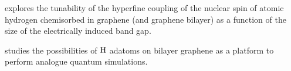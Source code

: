  explores the tunability of the hyperfine coupling of the nuclear spin of atomic hydrogen chemisorbed in graphene (and graphene bilayer) as a function of the size of the electrically induced band gap.

 studies the possibilities of $\ce{H}$ adatoms on bilayer graphene as a platform to perform analogue quantum simulations.


\newpage

















